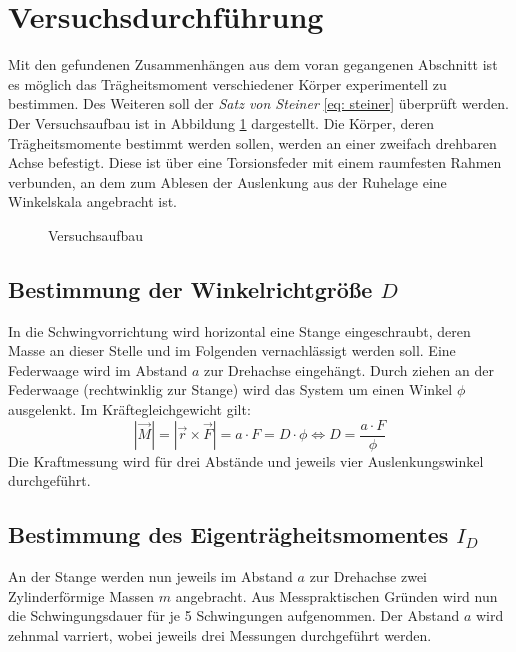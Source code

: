 \section{Versuchsdurchführung}
Mit den gefundenen Zusammenhängen aus dem voran gegangenen Abschnitt ist es
möglich das Trägheitsmoment verschiedener Körper experimentell zu bestimmen.
Des Weiteren soll der \textit{Satz von Steiner} \eqref{eq: steiner} überprüft %
werden. \\
Der Versuchsaufbau ist in Abbildung \ref{fig: aufbau} dargestellt. Die Körper, deren
Trägheitsmomente bestimmt werden sollen, werden an einer zweifach drehbaren Achse
befestigt. Diese ist über eine Torsionsfeder mit einem raumfesten Rahmen verbunden,
an dem zum Ablesen der Auslenkung aus der Ruhelage eine Winkelskala angebracht ist.
\begin{figure}
  \centering
  \caption{Versuchsaufbau \cite{anleitung01}}
  \label{fig: aufbau}
\end{figure}


\subsection{Bestimmung der Winkelrichtgröße $D$}
In die Schwingvorrichtung wird horizontal eine Stange eingeschraubt, deren Masse an dieser
Stelle und im Folgenden vernachlässigt werden soll. Eine Federwaage wird im Abstand $a$ zur
Drehachse eingehängt. Durch ziehen an der Federwaage (rechtwinklig zur Stange) wird das System um einen Winkel $\phi$
ausgelenkt. Im Kräftegleichgewicht gilt:
\begin{equation}
  \left| \vec{M} \right| = \left|\vec{r} \times \vec{F} \right| = a \cdot F = D \cdot \phi \iff D = \frac{a \cdot F}{\phi}
\end{equation}
Die Kraftmessung wird für drei Abstände und jeweils vier Auslenkungswinkel durchgeführt.

\subsection{Bestimmung des Eigenträgheitsmomentes $I_D$}
An der Stange werden nun jeweils im Abstand $a$ zur Drehachse zwei Zylinderförmige
Massen $m$ angebracht. Aus Messpraktischen Gründen wird nun die Schwingungsdauer
für je 5 Schwingungen aufgenommen. Der Abstand $a$ wird zehnmal varriert, wobei jeweils
drei Messungen durchgeführt werden.


